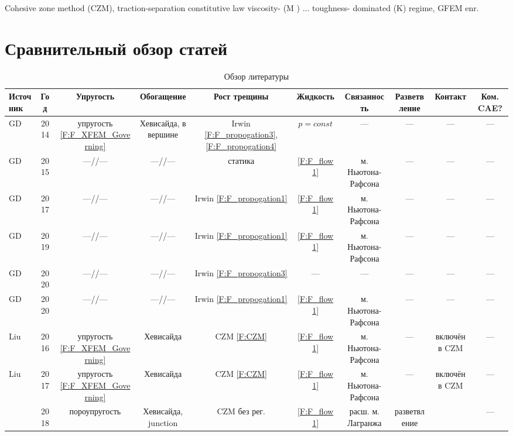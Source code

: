 Cohesive zone method (CZM), traction-separation constitutive law \cite{Moes2016}
viscosity- (M ) ... toughness- dominated (K) regime, GFEM enr.



\section{Сравнительный обзор статей}
\begin{landscape}
\begin{table}[h!]
	\caption{Обзор литературы}
	\footnotesize
	\begin{tabular}{|l|c|c|c|c|c|c|c|c|c|}
		\hline
		Источник & Год & Упругость & Обогащение & Рост трещины & Жидкость & Связанность & Разветвление & Контакт & Ком. CAE? \\
		\hline
		GD\cite{Gupta2014}&2014&упругость \eqref{F:F_XFEM_Governing}&Хевисайда, в вершине&Irwin \eqref{F:F_propogation3}, \eqref{F:F_propogation4} &$p=const$&---&---&---&---\\
		\hline
		GD\cite{Gupta2015}&2015&---//---&---//---&статика&\eqref{F:F_flow1}&м. Ньютона-Рафсона&---&---&---\\
		\hline
		GD\cite{Gupta2017}&2017&---//---&---//---&Irwin \eqref{F:F_propogation1}&\eqref{F:F_flow1}&м. Ньютона-Рафсона&---&---&---\\
		\hline
		GD\cite{Duarte2019}&2019&---//---&---//---&Irwin \eqref{F:F_propogation1}&\eqref{F:F_flow1}&м. Ньютона-Рафсона&---&---&---\\
		\hline
		GD\cite{Duarte2020_validation}&2020&---//---&---//---&Irwin \eqref{F:F_propogation3}&---&---&---&---&---\\
		\hline
		GD\cite{Duarte2020}&2020&---//---&---//---&Irwin \eqref{F:F_propogation1}&\eqref{F:F_flow1}&м. Ньютона-Рафсона&---&---&---\\
		\hline
		
		Liu\cite{Liu2016}&2016&упругость \eqref{F:F_XFEM_Governing}&Хевисайда&CZM \eqref{F:CZM}&\eqref{F:F_flow1}&м. Ньютона-Рафсона&---&включён в CZM&---\\
		\hline
		Liu\cite{Liu2017}&2017&упругость \eqref{F:F_XFEM_Governing}&Хевисайда&CZM \eqref{F:CZM}&\eqref{F:F_flow1}&м. Ньютона-Рафсона&---&включён в CZM&---\\
		\hline		
		\cite{Paul2018}&2018&пороупругость&Хевисайда, junction&CZM без рег.&\eqref{F:F_flow1}&расш. м. Лагранжа&разветвление&&---\\
		\hline
		

\end{tabular}
\end{table}
\end{landscape}
